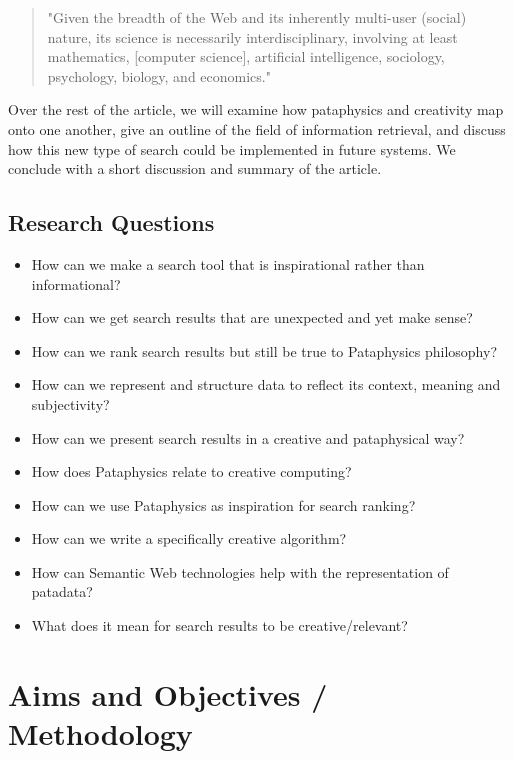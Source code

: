 \begin{quote}
  "Given the breadth of the Web and its inherently multi-user (social) nature, its science is necessarily interdisciplinary, involving at least mathematics, [computer science], artificial intelligence, sociology, psychology, biology, and economics." \citep{Hendler2008}
\end{quote}

Over the rest of the article, we will examine how pataphysics and creativity map onto one another, give an outline of the field of information retrieval, and discuss how this new type of search could be implemented in future systems. We conclude with a short discussion and summary of the article.

\subsection{Research Questions}

\begin{itemize}
  \item How can we make a search tool that is inspirational rather than informational?
  \item How can we get search results that are unexpected and yet make sense?
  \item How can we rank search results but still be true to Pataphysics philosophy?
  \item How can we represent and structure data to reflect its context, meaning and subjectivity?
  \item How can we present search results in a creative and pataphysical way?
  \item How does Pataphysics relate to creative computing?
  \item How can we use Pataphysics as inspiration for search ranking?
  \item How can we write a specifically creative algorithm?
  \item How can Semantic Web technologies help with the representation of patadata?
  \item What does it mean for search results to be creative/relevant?
\end{itemize}


\section{Aims and Objectives / Methodology}

